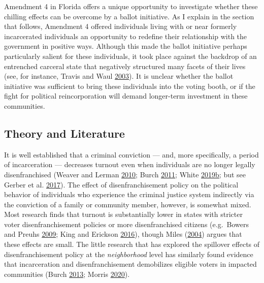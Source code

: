 \documentclass[
  12pt,
]{article}
\begin{document}
Amendment 4 in Florida offers a unique opportunity to investigate whether these chilling effects can be overcome by a ballot initiative. As I explain in the section that follows, Amendment 4 offered individuals living with or near formerly incarcerated individuals an opportunity to redefine their relationship with the government in positive ways. Although this made the ballot initiative perhaps particularly salient for these individuals, it took place against the backdrop of an entrenched carceral state that negatively structured many facets of their lives (see, for instance, Travis and Waul \protect\hyperlink{ref-Travis2003}{2003}). It is unclear whether the ballot initiative was sufficient to bring these individuals into the voting booth, or if the fight for political reincorporation will demand longer-term investment in these communities.

\hypertarget{theory-and-literature}{%
\subsection*{Theory and Literature}\label{theory-and-literature}}

It is well established that a criminal conviction --- and, more specifically, a period of incarceration --- decreases turnout even when individuals are no longer legally disenfranchised (Weaver and Lerman \protect\hyperlink{ref-Weaver2010}{2010}; Burch \protect\hyperlink{ref-Burch2011}{2011}; White \protect\hyperlink{ref-White2019}{2019}\protect\hyperlink{ref-White2019}{b}; but see Gerber et al. \protect\hyperlink{ref-Gerber2017}{2017}). The effect of disenfranchisement policy on the political behavior of individuals who experience the criminal justice system indirectly via the conviction of a family or community member, however, is somewhat mixed. Most research finds that turnout is substantially lower in states with stricter voter disenfranchisement policies or more disenfranchised citizens (e.g.~Bowers and Preuhs \protect\hyperlink{ref-Bowers2009}{2009}; King and Erickson \protect\hyperlink{ref-King2016}{2016}), though Miles (\protect\hyperlink{ref-Miles2004}{2004}) argues that these effects are small. The little research that has explored the spillover effects of disenfranchisement policy at the \emph{neighborhood} level has similarly found evidence that incarceration and disenfranchisement demobilizes eligible voters in impacted communities (Burch \protect\hyperlink{ref-Burch2013}{2013}; Morris \protect\hyperlink{ref-Morris2020}{2020}).
\end{document}
